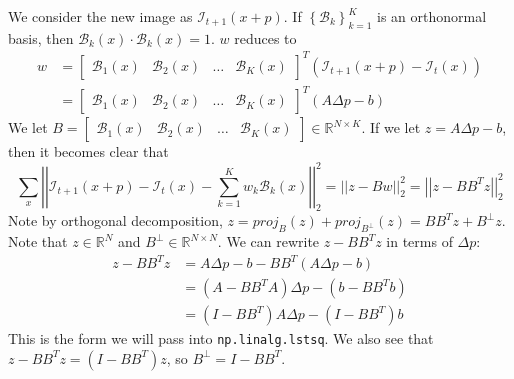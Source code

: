 \documentclass{article} %
\begin{document}
    We consider the new image as $\mathcal{I}_{t+1}\left(x+p\right)$. If ${\left\{\mathcal{B}_{k}\right\}}_{k=1}^{K}$ is an orthonormal basis, then $\mathcal{B}_{k}(x)\cdot \mathcal{B}_{k}(x)=1$. $w$ reduces to
    \begin{align*}
    w & =\left[\begin{array}{llll}
    \mathcal{B}_{1}\left(x\right) & \mathcal{B}_{2}\left(x\right) & \ldots & \mathcal{B}_{K}\left(x\right)
    \end{array}\right]^{T}\left(\mathcal{I}_{t+1}\left(x+p\right)-\mathcal{I}_{t}\left(x\right)\right)\\ & =\left[\begin{array}{llll}
    \mathcal{B}_{1}\left(x\right) & \mathcal{B}_{2}\left(x\right) & \ldots & \mathcal{B}_{K}\left(x\right)
    \end{array}\right]^{T}\left(A\Delta p-b\right)
    \end{align*}
    We let $B=\left[\begin{array}{cccc}
    \mathcal{B}_{1}\left(x\right) & \mathcal{B}_{2}\left(x\right) & \ldots & \mathcal{B}_{K}\left(x\right)
    \end{array}\right]\in \mathbb{R}^{N\times K}$. If we let $z=A\Delta p-b$, then it becomes clear that
    \begin{equation*}
    \sum _{x}{\left| \left| \mathcal{I}_{t+1}\left(x+p\right)-\mathcal{I}_{t}\left(x\right)-{\sum }_{k=1}^{K}w_{k}\mathcal{B}_{k}\left(x\right)\right| \right| }_{2}^{2}={\left| \left| z-Bw\right| \right| }_{2}^{2}={\left| \left| z-BB^{T}z\right| \right| }_{2}^{2}
    \end{equation*}
    Note by orthogonal decomposition, $z=proj_{B}\left(z\right)+proj_{{B^{\bot }}}\left(z\right)=BB^{T}z+B^{\bot }z$. Note that $z\in \mathbb{R}^{N}$ and $B^{\bot }\in \mathbb{R}^{N\times N}$. We can rewrite $z-BB^{T}z$ in terms of $\Delta p$:
    \begin{align*}
    z-BB^{T}z & =A\Delta p-b-BB^{T}\left(A\Delta p-b\right)\\ & =\left(A-BB^{T}A\right)\Delta p-(b-BB^{T}b)\\ & =\left(I-BB^{T}\right)A\Delta p-\left(I-BB^{T}\right)b
    \end{align*}
    This is the form we will pass into \verb|np.linalg.lstsq|. We also see that $z-BB^{T}z=\left(I-BB^{T}\right)z$, so $B^{\bot }=I-BB^{T}$.
\end{document}
